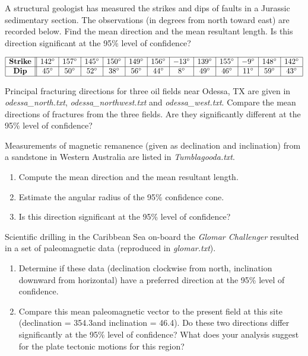 \begin{problem}
A structural geologist has measured the strikes and dips of faults in a Jurassic sedimentary 
section.  The observations (in degrees from north toward east) are recorded below.
Find the mean direction and the mean resultant length.
Is this direction significant at the 95\% level of confidence?

$$
\begin{array}{|c||c|c|c|c|c|c|c|c|c|c|c|c|} \hline
\mbox{\bf{Strike}} & 142^{\circ} & 157^{\circ} & 145^{\circ} & 150^{\circ} & 149^{\circ} & 156^{\circ} & -13^{\circ} & 139^{\circ} & 155^{\circ} & -9^{\circ} & 148^{\circ} & 142^{\circ} \\ \hline
\mbox{\bf{Dip}} & 45^{\circ} & 50^{\circ} & 52^{\circ} & 38^{\circ} & 56^{\circ} & 44^{\circ} & 8^{\circ} & 49^{\circ} & 46^{\circ} & 11^{\circ} & 59^{\circ} & 43^{\circ} \\ \hline
\end{array}
$$

\end{problem}

\begin{problem}
Principal fracturing directions for three oil fields near Odessa, TX are given in \emph{odessa\_north.txt},
\emph{odessa\_northwest.txt} and \emph{odessa\_west.txt}.  Compare the mean directions of fractures from
the three fields.  Are they significantly different at the 95\% level of confidence?
\end{problem}

\begin{problem}
	Measurements of magnetic remanence (given as declination and inclination) from a sandstone in Western
	Australia are listed in \emph{Tumblagooda.txt}.
	\begin{enumerate}[label=\alph*)]
	\item Compute the mean direction and the mean resultant length.
	\item Estimate the angular radius of the 95\% confidence cone.
	\item Is this direction significant at the 95\% level of confidence?
	\end{enumerate}
\end{problem}

\begin{problem}
Scientific drilling in the Caribbean Sea on-board the \emph{Glomar Challenger} resulted in a set of paleomagnetic data (reproduced in \emph{glomar.txt}).
\begin{enumerate}[label=\alph*)]
\item Determine if these data (declination clockwise from north, inclination downward from horizontal) have a
preferred direction at the 95\% level of confidence.
\item Compare this mean paleomagnetic vector to the present field
at this site (declination = 354.3\DS and inclination = 46.4\DS).
Do these two directions differ significantly at the 95\% level of confidence?
What does your analysis suggest for the plate tectonic motions for this region?
\end{enumerate}
\end{problem}
